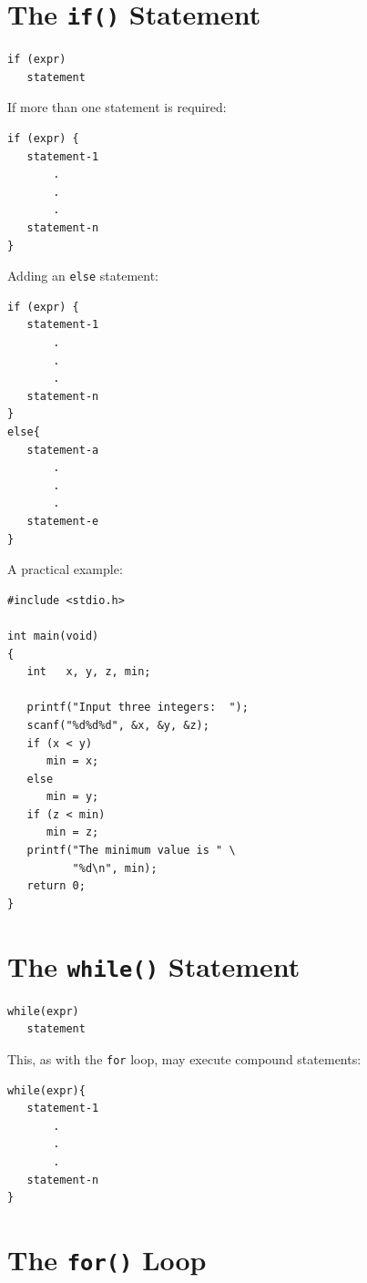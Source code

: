 \documentclass[a4,portraitt]{slides}
\begin{document}
\newpage
\section*{The {\tt if()} Statement}

\begin{verbatim}
if (expr)
   statement
\end{verbatim}

If more than one statement is required:

\begin{verbatim}
if (expr) {
   statement-1
       .
       .
       .
   statement-n
}
\end{verbatim}

\newpage
Adding an \verb^else^ statement:

\begin{verbatim}
if (expr) {
   statement-1
       .
       .
       .
   statement-n
}
else{
   statement-a
       .
       .
       .
   statement-e
}
\end{verbatim}

\newpage
A practical example:

\begin{verbatim}
#include <stdio.h>

int main(void)
{
   int   x, y, z, min;

   printf("Input three integers:  ");
   scanf("%d%d%d", &x, &y, &z);
   if (x < y)
      min = x;
   else
      min = y;
   if (z < min)
      min = z;
   printf("The minimum value is " \
          "%d\n", min);
   return 0;
}
\end{verbatim}

\section*{The {\tt while()} Statement}

\begin{verbatim}
while(expr)
   statement
\end{verbatim}

This, as with the \verb^for^ loop, may execute compound statements:

\begin{verbatim}
while(expr){
   statement-1
       .
       .
       .
   statement-n
}
\end{verbatim}

\section*{The {\tt for()} Loop}
\end{document}
